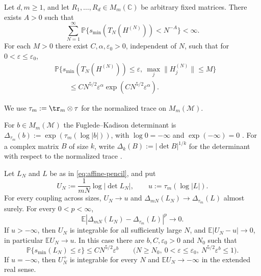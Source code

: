 \begin{theorem}\label{thm:pencil}
Let $d,m\ge 1$, and let $R_1,\ldots,R_d\in M_m(\mathbb C)$ be arbitrary fixed matrices.
There exists $A>0$ such that
\begin{equation}\label{eq:pencil-floor}
 \sum_{N=1}^{\infty}\mathbb P\{s_{\min}(T_N(H^{(N)}))<N^{-A}\}<\infty .
\end{equation}
For each $M>0$ there exist $C,\alpha,\varepsilon_0>0$, independent of $N$, such that for $0<\varepsilon\le\varepsilon_0$,
\begin{equation}\label{eq:pencil-bound}
 \begin{split}
 &\mathbb P\{s_{\min}(T_N(H^{(N)}))\le\varepsilon,\
                \max_j\|H_j^{(N)}\|\le M\}\\
 &\hspace{2em}\le C N^{5/2}\varepsilon^\alpha
                  \exp(CN^{5/2}\varepsilon^\alpha).
 \end{split}
\end{equation}
\end{theorem}

We use $\tau_m:=\tr_m\otimes\tau$ for the normalized trace on $M_m(\mathcal M)$.

\begin{definition}\label{def:fk-determinant}
For $b\in M_m(\mathcal M)$ the Fuglede--Kadison determinant is $\Delta_{\tau_m}(b):=\exp(\tau_m(\log|b|))$, with $\log 0=-\infty$ and $\exp(-\infty)=0$ \cite[Definition~2.1(ii) and Remark~2.2(i)]{MS24}.
For a complex matrix $B$ of size $k$, write $\Delta_k(B):=|\det B|^{1/k}$ for the determinant with respect to the normalized trace \cite[Proposition~2.3(vi)]{MS24}.
\end{definition}

\begin{theorem}\label{thm:affine}
Let $L_N$ and $L$ be as in \eqref{eq:affine-pencil}, and put
\[
 U_N:=\frac{1}{mN}\log|\det L_N|,\qquad
 u:=\tau_m(\log|L|).
\]
For every coupling across sizes, $U_N\to u$ and $\Delta_{mN}(L_N)\to\Delta_{\tau_m}(L)$ almost surely.
For every $0<p<\infty$,
\[
 \mathbb E|\Delta_{mN}(L_N)-\Delta_{\tau_m}(L)|^p\longrightarrow 0.
\]
If $u>-\infty$, then $U_N$ is integrable for all sufficiently large $N$, and $\mathbb E|U_N-u|\to0$, in particular $\mathbb E U_N\to u$.
In this case there are $b,C,\varepsilon_0>0$ and $N_0$ such that
\begin{equation}\label{eq:global-floor}
 \mathbb P\{s_{\min}(L_N)\le\varepsilon\}\le C N^{5/2}\varepsilon^b
 \qquad
 \bigl(N\ge N_0,\ 0<\varepsilon\le\varepsilon_0,\ N^{5/2}\varepsilon^b\le1\bigr).
\end{equation}
If $u=-\infty$, then $U_N^+$ is integrable for every $N$ and $\mathbb E U_N\to-\infty$ in the extended real sense.
\end{theorem}

